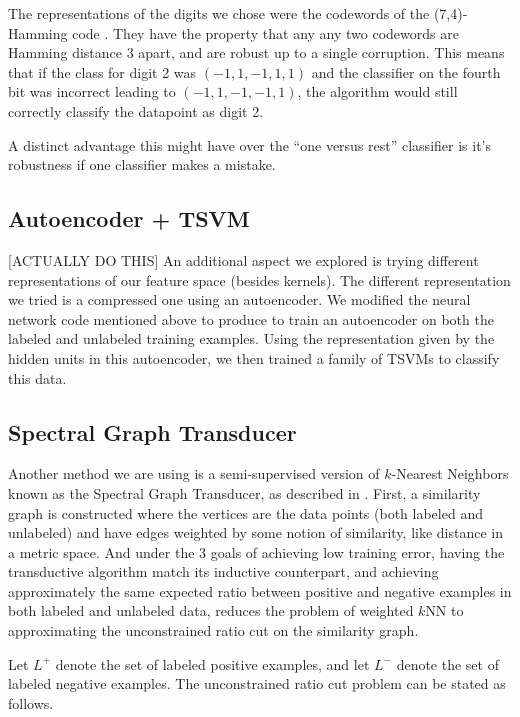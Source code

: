 \documentclass[11pt]{article}
\begin{document}
The representations of the digits we chose were the codewords of the
(7,4)-Hamming code \cite{macwilliams1977theory}. They have the property that any
any two codewords are Hamming distance 3 apart, and are robust up to
a single corruption. This means that if the class for digit 2 was
$(-1,1,-1,1,1)$ and the classifier on the fourth bit was incorrect
leading to $(-1,1,-1,-1,1)$, the algorithm would still correctly
classify the datapoint as digit 2.

A distinct advantage this might have over the ``one versus rest''
classifier is it's robustness if one classifier makes a mistake.

\subsection{Autoencoder + TSVM}

[ACTUALLY DO THIS] An additional aspect we explored is trying different representations of our feature space (besides kernels). The different representation we tried is a compressed one using an autoencoder. We modified the neural network code mentioned above to produce to train an autoencoder on both the labeled and unlabeled training examples. Using the representation given by the hidden units in this autoencoder, we then trained a family of TSVMs to classify this data.

\subsection{Spectral Graph Transducer}
Another method we are using is a semi-supervised version of $k$-Nearest Neighbors known as the Spectral Graph Transducer, as described in \cite{joachims2003transductive}. First, a similarity
graph is constructed where the vertices are the data points (both labeled
and unlabeled) and have edges weighted by some notion of similarity, like
distance in a metric space.
And under the 3 goals of achieving low training error, having the 
transductive algorithm match its inductive counterpart, and achieving
approximately the same expected ratio between positive and negative examples 
in both labeled and unlabeled data, \cite{joachims2003transductive}
reduces the problem of weighted $k$NN to approximating the unconstrained
ratio cut on the similarity graph.

Let $L^+$ denote the set of labeled positive examples, and let
$L^-$ denote the set of labeled negative examples.
The unconstrained ratio cut problem can be stated as follows.
\end{document}
